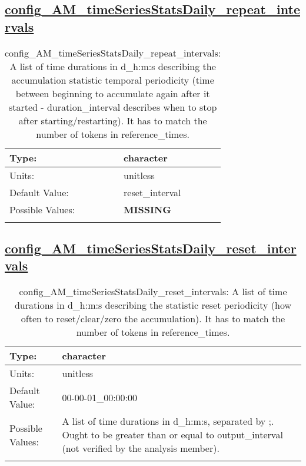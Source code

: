 \subsection[config\_AM\_timeSeriesStatsDaily\_repeat\_intervals]{\hyperref[sec:nm_tab_AM_timeSeriesStatsDaily]{config\_AM\_timeSeriesStatsDaily\_repeat\_intervals}}
\label{subsec:nm_sec_config_AM_timeSeriesStatsDaily_repeat_intervals}
\begin{center}
\begin{longtable}{| p{2.0in} || p{4.0in} |}
    \hline
    Type: & character \\
    \hline
    Units: & \si{unitless} \\
    \hline
    Default Value: & reset\_interval \\
    \hline
    Possible Values: & {\bf \color{red} MISSING} \\
    \hline
    \caption{config\_AM\_timeSeriesStatsDaily\_repeat\_intervals: A list of time durations in d\_h:m:s describing the accumulation statistic temporal periodicity (time between beginning to accumulate again after it started - duration\_interval describes when to stop after starting/restarting). It has to match the number of tokens in reference\_times.}
\end{longtable}
\end{center}
\subsection[config\_AM\_timeSeriesStatsDaily\_reset\_intervals]{\hyperref[sec:nm_tab_AM_timeSeriesStatsDaily]{config\_AM\_timeSeriesStatsDaily\_reset\_intervals}}
\label{subsec:nm_sec_config_AM_timeSeriesStatsDaily_reset_intervals}
\begin{center}
\begin{longtable}{| p{2.0in} || p{4.0in} |}
    \hline
    Type: & character \\
    \hline
    Units: & \si{unitless} \\
    \hline
    Default Value: & 00-00-01\_00:00:00 \\
    \hline
    Possible Values: & A list of time durations in d\_h:m:s, separated by ;. Ought to be greater than or equal to output\_interval (not verified by the analysis member). \\
    \hline
    \caption{config\_AM\_timeSeriesStatsDaily\_reset\_intervals: A list of time durations in d\_h:m:s describing the statistic reset periodicity (how often to reset/clear/zero the accumulation). It has to match the number of tokens in reference\_times.}
\end{longtable}
\end{center}
